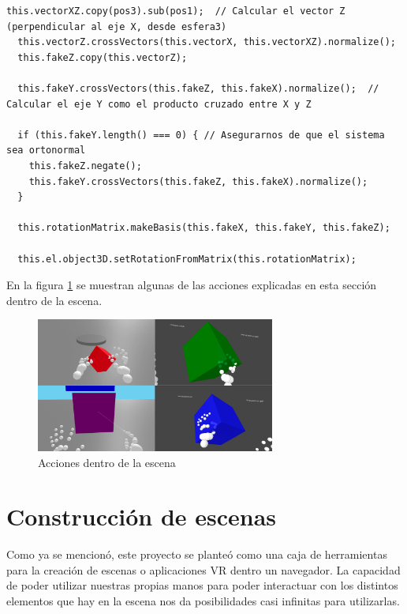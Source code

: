 \documentclass[a4paper, 12pt]{book}
\begin{document}
\begin{itemize}
\begin{lstlisting}[caption=Creación del falso eje de coordenadas, captionpos=b, label=lst:fake_coords]
  this.vectorXZ.copy(pos3).sub(pos1);  // Calcular el vector Z (perpendicular al eje X, desde esfera3)
  this.vectorZ.crossVectors(this.vectorX, this.vectorXZ).normalize();
  this.fakeZ.copy(this.vectorZ);

  this.fakeY.crossVectors(this.fakeZ, this.fakeX).normalize();  // Calcular el eje Y como el producto cruzado entre X y Z
  
  if (this.fakeY.length() === 0) { // Asegurarnos de que el sistema sea ortonormal
    this.fakeZ.negate();
    this.fakeY.crossVectors(this.fakeZ, this.fakeX).normalize();
  }
  
  this.rotationMatrix.makeBasis(this.fakeX, this.fakeY, this.fakeZ);
  
  this.el.object3D.setRotationFromMatrix(this.rotationMatrix); 
\end{lstlisting}
\end{itemize}

En la figura \ref{fig:mosaico} se muestran algunas de las acciones explicadas en esta sección dentro de la escena.

\begin{figure}[H] 
  \centering
  \includegraphics[width=0.7\textwidth]{img/colage.png} 
  \caption{Acciones dentro de la escena}
  \label{fig:mosaico}
\end{figure}

\section{Construcción de escenas}
\label{sec:escenas}

Como ya se mencionó, este proyecto se planteó como una caja de herramientas para la creación de escenas o aplicaciones VR dentro un navegador. La capacidad de poder utilizar nuestras propias manos para poder interactuar con los distintos elementos que hay en la escena nos da posibilidades casi infinitas para utilizarlas. 
\end{document}
